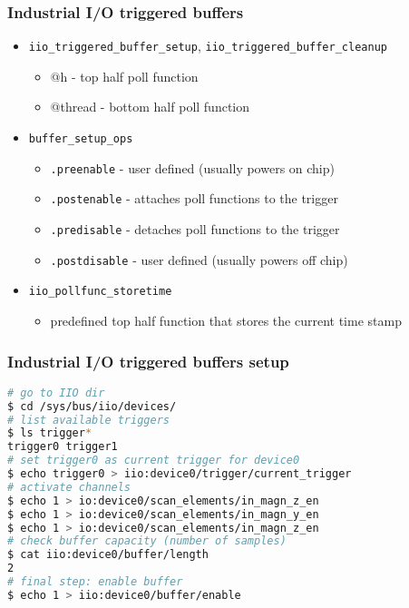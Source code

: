 \documentclass[aspectratio=169]{beamer}
\begin{document}
\begin{frame}
\frametitle{Industrial I/O triggered buffers}
\begin{itemize}
    \item \texttt{iio\_triggered\_buffer\_setup}, \texttt{iio\_triggered\_buffer\_cleanup}
    \begin{itemize}
        \item @h - top half poll function
        \item @thread - bottom half poll function
    \end{itemize}
    \item \texttt{buffer\_setup\_ops}
        \begin{itemize}
            \item \texttt{.preenable} - user defined (usually powers on chip)
            \item \texttt{.postenable} - attaches poll functions to the trigger
            \item \texttt{.predisable} - detaches poll functions to the trigger
            \item \texttt{.postdisable} - user defined (usually powers off chip)
        \end{itemize}
    \item \texttt{iio\_pollfunc\_storetime}
    \begin{itemize}
        \item predefined top half function that stores the current time stamp
    \end{itemize}
\end{itemize}
\end{frame}

\begin{frame}[fragile]
\frametitle{Industrial I/O triggered buffers setup}
\begin{lstlisting}[language=bash]
# go to IIO dir
$ cd /sys/bus/iio/devices/
# list available triggers
$ ls trigger*
trigger0 trigger1
# set trigger0 as current trigger for device0
$ echo trigger0 > iio:device0/trigger/current_trigger
# activate channels
$ echo 1 > io:device0/scan_elements/in_magn_z_en
$ echo 1 > io:device0/scan_elements/in_magn_y_en
$ echo 1 > io:device0/scan_elements/in_magn_z_en
# check buffer capacity (number of samples)
$ cat iio:device0/buffer/length
2
# final step: enable buffer
$ echo 1 > iio:device0/buffer/enable
\end{lstlisting}
\end{frame}
\end{document}
